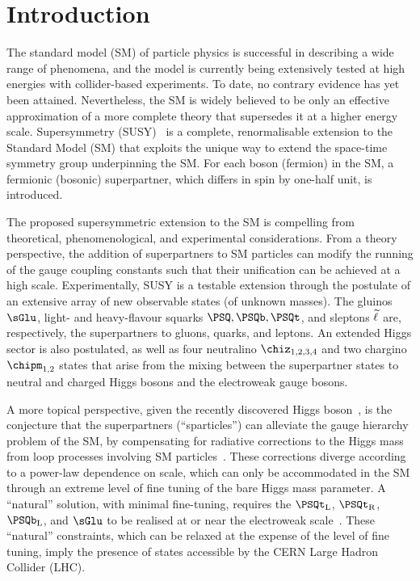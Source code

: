 \section{Introduction}
\label{sec:introduction}

The standard model (SM) of particle physics is successful in
describing a wide range of phenomena, and the model is currently being
extensively tested at high energies with collider-based experiments.
To date, no contrary evidence has yet been attained. Nevertheless, the
SM is widely believed to be only an effective approximation of a more
complete theory that supersedes it at a higher energy
scale. Supersymmetry (SUSY)~\cite{ref:SUSY-1, ref:SUSY0, ref:SUSY1,
  ref:SUSY2, ref:SUSY3, ref:SUSY4} is a complete, renormalisable
extension to the Standard Model (SM) that exploits the unique way to
extend the space-time symmetry group underpinning the SM. For each
boson (fermion) in the SM, a fermionic (bosonic) superpartner, which
differs in spin by one-half unit, is introduced.

The proposed supersymmetric extension to the SM is compelling from
theoretical, phenomenological, and experimental considerations. From a
theory perspective, the addition of superpartners to SM particles can
modify the running of the gauge coupling constants such that their
unification can be achieved at a high scale. Experimentally, SUSY is a
testable extension through the postulate of an extensive array of new
observable states (of unknown masses). The gluinos $\sGlu$, light- and
heavy-flavour squarks $\PSQ, \PSQb, \PSQt$, and sleptons $\widetilde{\ell}$ are,
respectively, the superpartners to gluons, quarks, and leptons. An
extended Higgs sector is also postulated, as well as four neutralino
$\chiz_{1,2,3,4}$ and two chargino $\chipm_{1,2}$ states that arise
from the mixing between the superpartner states to neutral and charged
Higgs bosons and the electroweak gauge bosons. %

A more topical perspective, given the recently discovered Higgs
boson~\cite{ref:atlashiggsdiscovery, ref:cmshiggsdiscoverylong}, is
the conjecture that the superpartners (``sparticles'') can alleviate
the gauge hierarchy problem of the SM, by compensating for radiative
corrections to the Higgs mass from loop processes involving SM
particles~\cite{ref:hierarchy1, ref:hierarchy2}. These corrections
diverge according to a power-law dependence on scale, which can only
be accommodated in the SM through an extreme level of fine tuning of
the bare Higgs mass parameter. A ``natural'' solution, with minimal
fine-tuning, requires the $\PSQt_\text{L}$, $\PSQt_\text{R}$,
$\PSQb_\text{L}$, and $\sGlu$ to be realised at or near the
electroweak scale~\cite{ref:barbierinsusy}. These ``natural''
constraints, which can be relaxed at the expense of the level of fine
tuning, imply the presence of states accessible by the CERN Large
Hadron Collider (LHC). %

